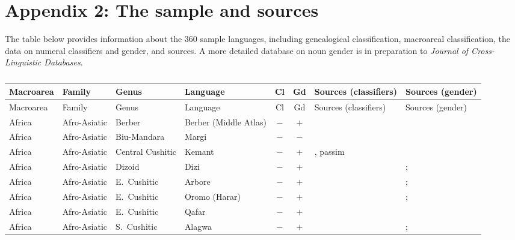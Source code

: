 
\section*{Appendix 2: The sample and sources}

The table below provides information about the 360 sample languages, including genealogical classification, macroareal classification, the data on numeral classifiers and gender, and sources. A more detailed database on noun gender is in preparation to \textit{Journal of Cross-Linguistic Databases}.


\begin{landscape}
\tiny
\begin{longtable}{l>{\raggedright\arraybackslash}p{2.2cm}>{\raggedright}p{2.5cm}>{\raggedright\arraybackslash}p{2.5cm}cc>{\raggedright\arraybackslash}p{3.4cm}>{\raggedright\arraybackslash}p{3.4cm}}
\caption{}\\
\lsptoprule Macroarea &  Family &  Genus &  Language &  Cl &  Gd &  Sources (classifiers) &  Sources (gender)\\\midrule\endfirsthead
\midrule    Macroarea &  Family &  Genus &  Language &  Cl &  Gd &  Sources (classifiers) &  Sources (gender)\\\midrule\endhead
\endfoot\lspbottomrule\endlastfoot
Africa & Afro-Asiatic & Berber & Berber (Middle Atlas) & $-$ & $+$ & \citealt[24--25]{Penchoen1973} & \citealt[12--13, 21--22, 25--27, 39--40, 54--55]{Penchoen1973}\\
Africa & Afro-Asiatic & Biu-Mandara & Margi & $-$ & $-$ & \citealt{Gil2013} & \citealt[46, 72--75, 85--87]{Hoffman1963}\\
Africa & Afro-Asiatic & Central Cushitic & Kemant & $-$ & $+$ & \citealt[329]{Appleyard1975}, passim & \citealt[319--322, 332--333]{Appleyard1975}\\
Africa & Afro-Asiatic & Dizoid & Dizi & $-$ & $+$ & \citealt{Gil2013} & \citealt{Corbett2013}; \citealt[295]{Nichols1992}\\
Africa & Afro-Asiatic & E.~Cushitic & Arbore & $-$ & $+$ & \citealt{Gil2013} & \citealt{Corbett2013}; \citealt[131--132]{Hayward1984}\\
Africa & Afro-Asiatic & E.~Cushitic & Oromo (Harar) & $-$ & $+$ & \citealt{Gil2013} & \citealt{Corbett2013}; \citealt[65]{Owens1985}\\
Africa & Afro-Asiatic & E.~Cushitic & Qafar & $-$ & $+$ & \citealt[185--186]{Bliese1981} & \citealt[180--182, 186--188]{Bliese1981}\\
Africa & Afro-Asiatic & S.~Cushitic & Alagwa & $-$ & $+$ & \citealt{Gil2013} & \citealt{Corbett2013}; \citealt[147--149]{Mous2008}\\

\end{longtable}
\end{landscape}
